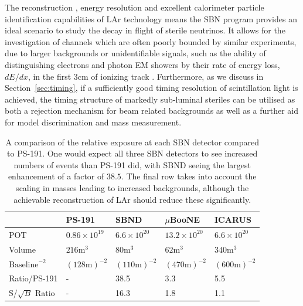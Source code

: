 \documentclass[11pt, a4paper]{article}
\newcommand{\refsec}[1]{Section~\ref{#1}}
\begin{document}
The reconstruction \cite{Church:2013hea, Marshall:2015rfa}, energy resolution
\cite{Sorel:2014rka} and excellent calorimeter particle identification
capabilities of LAr \cite{Antonello:2012hu} technology means the SBN program
provides an ideal scenario to study the decay in flight of sterile neutrinos.
It allows for the investigation of channels which are often poorly bounded by
similar experiments, due to larger backgrounds or unidentifiable signals, such
as the ability of distinguishing electrons and photon EM showers by their rate
of energy loss, $dE/dx$, in the first 3cm of ionizing track \cite{szelc:2007}.
Furthermore, as we discuss in \refsec{sec:timing}, if a sufficiently good timing
resolution of scintillation light is achieved, the timing structure of markedly
sub-luminal steriles can be utilised as both a rejection mechanism for beam
related backgrounds as well as a further aid for model discrimination and mass
measurement.

\begin{table}[t!]
\centering
\begin{tabular}{| l || l | l | l | l |}
	\hline
	& PS-191 & SBND & $\mu$BooNE & ICARUS \\ \hline \hline
	POT	& $0.86 \times 10^{19}$	& $6.6 \times 10^{20}$	&	$13.2 \times 10^{20}$     &  $6.6 \times 10^{20}$ \\ \hline
	Volume	& $216\text{m}^3$	&	$80\text{m}^3$	&	$62\text{m}^3$	     &   $340\text{m}^3$	\\ \hline
	$\text{Baseline}^{-2}$	& $(128 	\text{m} )^{-2}$	&$(110 \text{m} )^{-2}$	&	$(470 \text{m} )^{-2}$			     & $(600 \text{m} )^{-2}$	  \\ \hline
Ratio/PS-191 & - 	& 38.5 	& 3.3	& 5.5\\ \hline
	S/$\sqrt{B}$ Ratio & - 	& 16.3 	& 1.8	& 1.1\\ \hline
\end{tabular}

\caption{\label{tab:exposure} A comparison of the relative exposure at each SBN detector
compared to PS-191. One would expect all  three SBN detectors to see increased
numbers of events than PS-191 did, with SBND seeing the largest enhancement of a
factor of $38.5$. The final row takes into account the scaling in masses
leading to increased backgrounds, although the achievable reconstruction of LAr
should reduce these significantly.}

\end{table}
\end{document}

